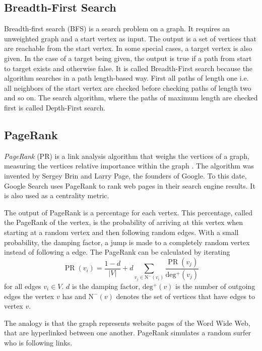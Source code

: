 \subsection{Breadth-First Search}
Breadth-first search (BFS) is a search problem on a graph.
It requires an unweighted graph and a start vertex as input.
The output is a set of vertices that are reachable from the start vertex.
In some special cases, a target vertex is also given. In the case of a target being given, the output is true if a path from start to target exists and otherwise false.
It is called Breadth-First search because the algorithm searches in a path length-based way. First all paths of length one i.e. all neighbors of the start vertex are checked before checking paths of length two and so on.
The search algorithm, where the paths of maximum length are checked first is called Depth-First search.

\subsection{PageRank}
\emph{PageRank} (PR) is a link analysis algorithm that weighs the vertices of a graph, measuring the vertices relative importance within the graph \cite{pagerank}.
The algorithm was invented by Sergey Brin and Larry Page, the founders of Google. To this date, Google Search uses PageRank to rank web pages in their search engine results.
It is also used as a centrality metric.

The output of PageRank is a percentage for each vertex. This percentage, called the PageRank of the vertex, is the probability of arriving at this vertex when starting at a random vertex and then following random edges.
With a small probability, the damping factor, a jump is made to a completely random vertex instead of following a edge.
The PageRank can be calculated by iterating
\begin{equation*}
	\operatorname{PR}(v_i) = \frac{1 - d}{|V|} + d \sum_{v_j \in \operatorname{N^-}(v_i)} \frac{\operatorname{PR}(v_j)}{\operatorname{deg^+}(v_j)}
\end{equation*}
for all edges $v_i \in V$.
$d$ is the damping factor, $\operatorname{deg^+}(v)$ is the number of outgoing edges the vertex $v$ has and $\operatorname{N^-}(v)$ denotes the set of vertices that have edges to vertex $v$.

The analogy is that the graph represents website pages of the Word Wide Web, that are hyperlinked between one another. 
PageRank simulates a random surfer who is following links.

